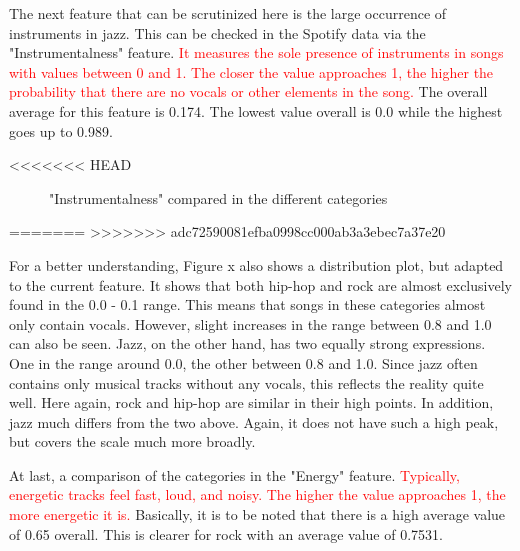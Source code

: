 The next feature that can be scrutinized here is the large occurrence of instruments in jazz.
This can be checked in the Spotify data via the "Instrumentalness" feature.
\textcolor{red}{It measures the sole presence of instruments in songs with values between 0 and 1.
The closer the value approaches 1, the higher the probability that there are no vocals or other
elements in the song.} The overall average for this feature is 0.174.
The lowest value overall is 0.0 while the highest goes up to 0.989.

<<<<<<< HEAD
\begin{figure}[H]
    \centering
    \qquad
    \caption{"Instrumentalness" compared in the different categories}%
    \label{du_dp_bp_instr_categorie_dependent}%
\end{figure}
=======
>>>>>>> adc72590081efba0998cc000ab3a3ebec7a37e20

For a better understanding, Figure x  also shows a distribution plot,
but adapted to the current feature.
It shows that both hip-hop and rock are almost exclusively found in the 0.0 - 0.1 range.
This means that songs in these categories almost only contain vocals.
However, slight increases in the range between 0.8 and 1.0 can also be seen. Jazz,
on the other hand, has two equally strong expressions. One in the range around 0.0,
the other between 0.8 and 1.0. Since jazz often contains only musical tracks without
any vocals, this reflects the reality quite well.
Here again, rock and hip-hop are similar in their high points.
In addition, jazz much differs from the two above. Again, it does not have such a high peak, 
but covers the scale much more broadly.

At last, a comparison of the categories in the "Energy" feature.
\textcolor{red}{Typically, energetic tracks feel fast, loud, and noisy.
The higher the value approaches 1, the more energetic it is.}
Basically, it is to be noted that there is a high average value of 0.65 overall.
This is clearer for rock with an average value of 0.7531.


